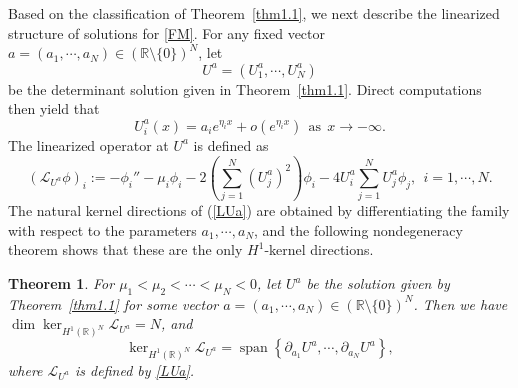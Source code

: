 \documentclass[11pt]{article}
\numberwithin{equation}{section}
\newtheorem{theorem}{Theorem}[section]
\theoremstyle{definition}
\begin{document}
 Based on the classification of Theorem~\ref{thm1.1}, we next describe the linearized
structure of solutions for \eqref{FM}.
For any fixed vector
$a=(a_1,\cdots,a_N)\in(\mathbb R\setminus\{0\})^N$, let
\begin{equation}\label{Ua}
	U^a=(U_1^a,\cdots,U_N^a)
\end{equation}
be the determinant solution given in Theorem~\ref{thm1.1}. Direct computations then yield that
\[
U_i^a(x)=a_i e^{\eta_i x}+o(e^{\eta_i x})
\ \  \mbox{as} \ \  x\to-\infty .
\]
The linearized operator at $U^a$  is defined as
\begin{equation}\label{LUa}
	(\mathcal L_{U^a}\phi)_i
	:=
	-\phi_i''
	-\mu_i\phi_i
	-2\left(\sum_{j=1}^N (U_j^a)^2\right)\phi_i
	-4U_i^a\sum_{j=1}^N U_j^a\phi_j,
	\ \  i=1,\cdots,N.
\end{equation}
The natural kernel directions of (\ref{LUa}) are obtained by differentiating
the family with respect to the parameters \(a_1,\cdots,a_N\), and the
following nondegeneracy theorem shows that these are the only \(H^1\)-kernel directions.



\begin{theorem}
\label{prop:nondegeneracy}
For \(\mu_1<\mu_2<\cdots<\mu_N<0\),  let \(U^a\) be the
solution given by Theorem~\ref{thm1.1} for some vector
\(a=(a_1,\cdots,a_N)\in(\mathbb R\setminus\{0\})^N\).
Then we have $\dim\ker_{H^1(\mathbb R)^N}\mathcal L_{U^a}=N$, and
\[
\ker_{H^1(\mathbb R)^N}\mathcal L_{U^a}
=
\operatorname{span}
\left\{
\partial_{a_1}U^a,\cdots,\partial_{a_N}U^a
\right\},
\]
where \(\mathcal L_{U^a}\) is defined by \eqref{LUa}.
\end{theorem}
\end{document}
